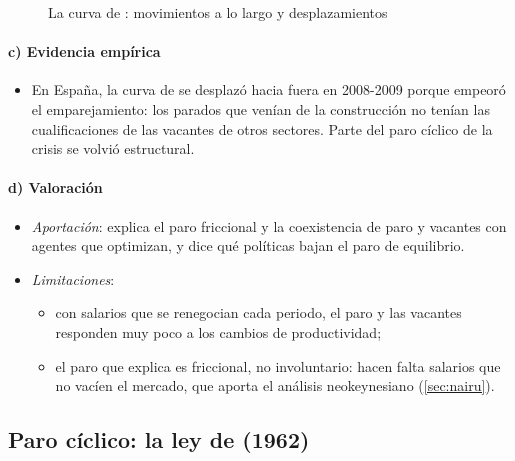 \documentclass[11pt]{article}
\begin{document}
\begin{figure}[H]
\centering
\caption{La curva de : movimientos a lo largo y desplazamientos}\label{fig:beveridge-lectura}
\end{figure}

\paragraph{c) Evidencia empírica}

\begin{itemize}
\item En España, la curva de  se desplazó hacia fuera en 2008-2009 porque empeoró el emparejamiento: los parados que venían de la construcción no tenían las cualificaciones de las vacantes de otros sectores\nocite{BoscaEtAl2017Beveridge}. Parte del paro cíclico de la crisis se volvió estructural.
\end{itemize}

\paragraph{d) Valoración}

\begin{itemize}
\item \emph{Aportación}: explica el paro friccional y la coexistencia de paro y vacantes con agentes que optimizan, y dice qué políticas bajan el paro de equilibrio.
\item \emph{Limitaciones}:
  \begin{itemize}
  \item con salarios que se renegocian cada periodo, el paro y las vacantes responden muy poco a los cambios de productividad\nocite{Shimer2005Cyclical};
  \item el paro que explica es friccional, no involuntario: hacen falta salarios que no vacíen el mercado, que aporta el análisis neokeynesiano (\ref{sec:nairu}).
  \end{itemize}
\end{itemize}

\subsection{Paro cíclico: la ley de  (1962)}\label{sec:okun}
\end{document}
